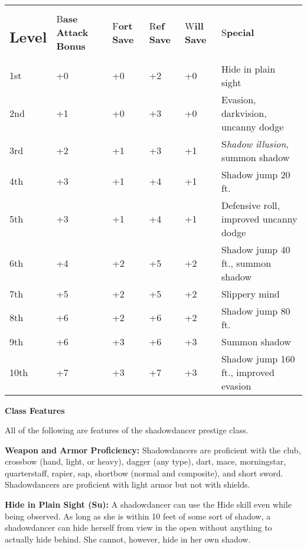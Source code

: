 \documentclass{article}
\begin{document}
\vspace{12pt}
\parindent=0pt
\begin{tabular}{|>{\raggedright}p{25pt}|>{\raggedright}p{31pt}|>{\raggedright}p{21pt}|>{\raggedright}p{21pt}|>{\raggedright}p{21pt}|>{\raggedright}p{156pt}|}
\hline
\multicolumn{6}{|p{278pt}|}{T\textbf{able: The Shadowdancer}}\tabularnewline
\hline
\subsection*{L\textbf{evel}} & B\textbf{ase}\linebreak{}
\textbf{Attack}\linebreak{}
\textbf{Bonus} & F\textbf{ort}\linebreak{}
\textbf{Save} & R\textbf{ef}\linebreak{}
\textbf{Save} & W\textbf{ill}\linebreak{}
\textbf{Save} & S\textbf{pecial}\tabularnewline
\hline
1st & +0 & +0 & +2 & +0 & Hide in plain sight\tabularnewline
\hline
2nd & +1 & +0 & +3 & +0 & Evasion, darkvision, uncanny dodge\tabularnewline
\hline
3rd & +2 & +1 & +3 & +1 & S\textit{hadow illusion}, summon shadow\tabularnewline
\hline
4th & +3 & +1 & +4 & +1 & Shadow jump 20 ft.\tabularnewline
\hline
5th & +3 & +1 & +4 & +1 & Defensive roll, improved uncanny dodge\tabularnewline
\hline
6th & +4 & +2 & +5 & +2 & Shadow jump 40 ft., summon shadow\tabularnewline
\hline
7th & +5 & +2 & +5 & +2 & Slippery mind\tabularnewline
\hline
8th & +6 & +2 & +6 & +2 & Shadow jump 80 ft.\tabularnewline
\hline
9th & +6 & +3 & +6 & +3 & Summon shadow\tabularnewline
\hline
10th & +7 & +3 & +7 & +3 & Shadow jump 160 ft., improved evasion\tabularnewline
\hline
\end{tabular}

\vspace{12pt}
\textbf{Class Features}

All of the following are features of the shadowdancer prestige class.

\textbf{Weapon and Armor Proficiency:} Shadowdancers are proficient with the club, 
crossbow (hand, light, or heavy), dagger (any type), dart, mace, morningstar, quarterstaff, 
rapier, sap, shortbow (normal and composite), and short sword. Shadowdancers are 
proficient with light armor but not with shields.

\textbf{Hide in Plain Sight (Su):} A shadowdancer can use the Hide skill even while 
being observed. As long as she is within 10 feet of some sort of shadow, a shadowdancer 
can hide herself from view in the open without anything to actually hide behind. 
She cannot, however, hide in her own shadow.
\end{document}
